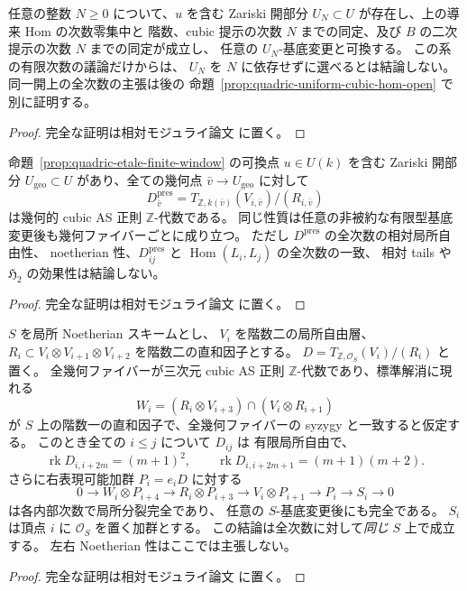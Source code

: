 \begin{corollary}[各有限次数の開近傍への拡張]
\label{cor:quadric-each-finite-degree-open}
任意の整数 $N\ge0$ について、$u$ を含む Zariski 開部分
$U_N\subset U$ が存在し、上の導来 Hom の次数零集中と
階数、cubic 提示の次数 $N$ までの同定、及び
$B$ の二次提示の次数 $N$ までの同定が成立し、
任意の $U_N$-基底変更と可換する。
この系の有限次数の議論だけからは、
$U_N$ を $N$ に依存せずに選べるとは結論しない。
同一開上の全次数の主張は後の
命題~\ref{prop:quadric-uniform-cubic-hom-open} で別に証明する。
\end{corollary}
\begin{proof}
完全な証明は相対モジュライ論文 \cite[\texttt{artin_roots}]{QuadricModuli2026} に置く。
\end{proof}


\begin{proposition}
\label{prop:quadric-geometric-quintuple-open}
命題~\ref{prop:quadric-etale-finite-window} の可換点
$u\in U(k)$ を含む Zariski 開部分
$U_{\mathrm{geo}}\subset U$ があり、全ての幾何点
$\bar v\to U_{\mathrm{geo}}$ に対して
\[
 D^{\mathrm{pres}}_{\bar v}
       =T_{\mathbb Z,k(\bar v)}(V_{i,\bar v})/
                                  (R_{i,\bar v})
\]
は幾何的 cubic AS 正則 $\mathbb Z$-代数である。
同じ性質は任意の非被約な有限型基底変更後も幾何ファイバーごとに成り立つ。
ただし $D^{\mathrm{pres}}$ の全次数の相対局所自由性、
noetherian 性、$D^{\mathrm{pres}}_{ij}$ と
$\operatorname{Hom}(L_i,L_j)$ の全次数の一致、
相対 tails や $\mathfrak H_2$ の効果性は結論しない。
\end{proposition}
\begin{proof}
完全な証明は相対モジュライ論文 \cite[\texttt{artin_roots}]{QuadricModuli2026} に置く。
\end{proof}


\begin{lemma}
\label{lem:relative-geometric-cubic-flatness}
$S$ を局所 Noetherian スキームとし、
$V_i$ を階数二の局所自由層、
$R_i\subset V_i\otimes V_{i+1}\otimes V_{i+2}$
を階数二の直和因子とする。
$D=T_{\mathbb Z,\mathcal O_S}(V_i)/(R_i)$ と置く。
全幾何ファイバーが三次元 cubic AS 正則
$\mathbb Z$-代数であり、標準解消に現れる
\[
 W_i=(R_i\otimes V_{i+3})\cap(V_i\otimes R_{i+1})
\]
が $S$ 上の階数一の直和因子で、全幾何ファイバーの
syzygy と一致すると仮定する。
このとき全ての $i\le j$ について $D_{ij}$ は
有限局所自由で、
\[
 \operatorname{rk}D_{i,i+2m}=(m+1)^2,\qquad
 \operatorname{rk}D_{i,i+2m+1}=(m+1)(m+2).
\]
さらに右表現可能加群 $P_i=e_iD$ に対する
\[
 0\longrightarrow W_i\otimes P_{i+4}
 \longrightarrow R_i\otimes P_{i+3}
 \longrightarrow V_i\otimes P_{i+1}
 \longrightarrow P_i\longrightarrow S_i\longrightarrow0
 \tag{Geo-res}\label{eq:relative-geometric-cubic-resolution}
\]
は各内部次数で局所分裂完全であり、
任意の $S$-基底変更後にも完全である。
$S_i$ は頂点 $i$ に $\mathcal O_S$ を置く加群とする。
この結論は全次数に対して\emph{同じ} $S$ 上で成立する。
左右 Noetherian 性はここでは主張しない。
\end{lemma}
\begin{proof}
完全な証明は相対モジュライ論文 \cite[\texttt{artin_roots}]{QuadricModuli2026} に置く。
\end{proof}

